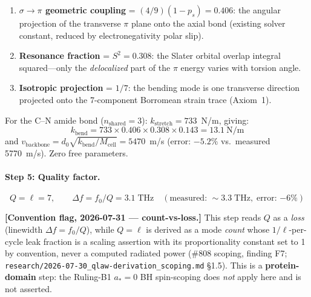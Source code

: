 \begin{enumerate}
    \item \textbf{$\sigma\to\pi$ geometric coupling} = $(4/9)(1-p_s) = 0.406$: the angular projection of the transverse $\pi$ plane onto the axial bond (existing solver constant, reduced by electronegativity polar slip).
    \item \textbf{Resonance fraction} = $S^2 = 0.308$: the Slater orbital overlap integral squared---only the \emph{delocalized} part of the $\pi$ energy varies with torsion angle.
    \item \textbf{Isotropic projection} = $1/7$: the bending mode is one transverse direction projected onto the 7-component Borromean strain trace (Axiom~1).
\end{enumerate}

\noindent For the C--N amide bond ($n_\mathrm{shared} = 3$): $k_\mathrm{stretch} = 733$~N/m, giving:
\begin{equation}
    k_\mathrm{bend} = 733 \times 0.406 \times 0.308 \times 0.143 = 13.1~\text{N/m}
\end{equation}
and $v_\mathrm{backbone} = d_0\sqrt{k_\mathrm{bend}/M_\mathrm{cell}} = 5470$~m/s (error: $-5.2\%$ vs.\ measured 5770~m/s).  Zero free parameters.

\paragraph{Step 5: Quality factor.}
\begin{equation}
    Q = \ell = 7, \qquad \Delta f = f_0 / Q = 3.1\;\mathrm{THz} \quad (\text{measured: } {\sim}3.3\;\mathrm{THz}, \;\text{error: }{-6\%})
\end{equation}

\noindent\textbf{[Convention flag, 2026-07-31 --- count-vs-loss.]}  This step reads $Q$ as a
\emph{loss} (linewidth $\Delta f = f_0/Q$), while $Q = \ell$ is derived as a mode \emph{count} whose
$1/\ell$-per-cycle leak fraction is a scaling assertion with its proportionality constant set to 1 by
convention, never a computed radiated power (\#808 scoping, finding F7;
\texttt{research/2026-07-30\_qlaw-derivation\_scoping.md} \S1.5).  This is a \textbf{protein-domain}
step: the Ruling-B1 $a_* = 0$ BH spin-scoping does \emph{not} apply here and is not asserted.

